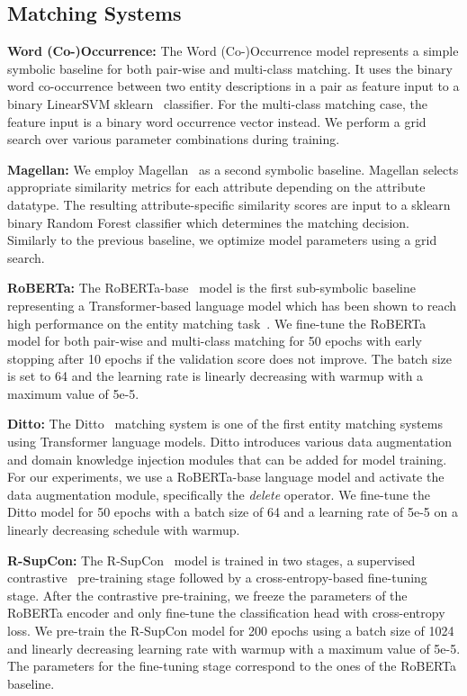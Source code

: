 \documentclass[sigconf,edbt]{acmart-edbt2024}
\begin{document}
\subsection{Matching Systems}
\label{subsec:baselines}

\textbf{Word (Co-)Occurrence:} The Word (Co-)Occurrence model represents a simple symbolic baseline for both pair-wise and multi-class matching. It uses the binary word co-occurrence between two entity descriptions in a pair as feature input to a binary LinearSVM sklearn~\cite{pedregosaScikitlearnMachineLearning2011} classifier. For the multi-class matching case, the feature input is a binary word occurrence vector instead. We perform a grid search over various parameter combinations during training.

\textbf{Magellan:} We employ Magellan~\cite{kondaMagellanBuildingEntity2016a} as a second symbolic baseline. Magellan selects appropriate similarity metrics for each attribute depending on the attribute datatype. The resulting attribute-specific similarity scores are input to a sklearn binary Random Forest classifier which determines the matching decision. Similarly to the previous baseline, we optimize model parameters using a grid search.

\textbf{RoBERTa:} The RoBERTa-base~\cite{liu_roberta_2019} model is the first sub-symbolic baseline representing a Transformer-based language model which has been shown to reach high performance on the entity matching task~\cite{liDeepEntityMatching2020,peetersDualobjectiveFinetuningBERT2021}.
We fine-tune the RoBERTa model for both pair-wise and multi-class matching for 50 epochs with early stopping after 10 epochs if the validation score does not improve. The batch size is set to 64 and the learning rate is linearly decreasing with warmup with a maximum value of 5e-5.

\textbf{Ditto:} The Ditto~\cite{liDeepEntityMatching2020} matching system is one of the first entity matching systems using Transformer language models. Ditto introduces various data augmentation and domain knowledge injection modules that can be added for model training. For our experiments, we use a RoBERTa-base language model and activate the data augmentation module, specifically the \textit{delete} operator.
We fine-tune the Ditto model for 50 epochs with a batch size of 64 and a learning rate of 5e-5 on a linearly decreasing schedule with warmup.  


\textbf{R-SupCon:} The R-SupCon~\cite{peetersSupervisedContrastiveLearning2022a} model is trained in two stages, a supervised contrastive~\cite{khoslaSupervisedContrastiveLearning2021} pre-training stage followed by a cross-entropy-based fine-tuning stage.
After the contrastive pre-training, we freeze the parameters of the RoBERTa encoder and only fine-tune the classification head with cross-entropy loss.
We pre-train the R-SupCon model for 200 epochs using a batch size of 1024 and linearly decreasing learning rate with warmup with a maximum value of 5e-5. The parameters for the fine-tuning stage correspond to the ones of the RoBERTa baseline.
\end{document}
